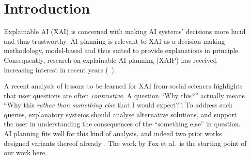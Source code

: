 \section{Introduction}
\label{introduction}

%
Explainable AI (XAI) is concerned with making AI systems' decisions
more lucid and thus trustworthy. AI planning is relevant to XAI as a
decision-making methodology, model-based and thus suited to provide
explanations in principle. Consequently, research on explainable AI
planning (XAIP) has received increasing interest in recent years
(\eg\ \cite{seegebarth:etal:icaps-12,smith:aaai-12,langley:etal:aaai-17,fox:etal:ijcai-ws-17,chakraborti:etal:ijcai-17,chakraborti:icaps-19}).

A recent analysis \cite{miller:ai-19} of lessons to be learned for XAI
from social sciences highlights that user questions are often
\emph{contrastive}. A question ``Why this?'' actually means ``Why this
\emph{rather than something else} that I would expect?''. To address
such queries, explanatory systems should analyse alternative
solutions, and support the user in understanding the consequences of
the ``something else'' in question.
%
AI planning fits well for this kind of analysis, and indeed two prior
works designed variants thereof already
\cite{fox:etal:ijcai-ws-17,miller:corr-18}. The work by Fox et al.\ is
the starting point of our work here.

